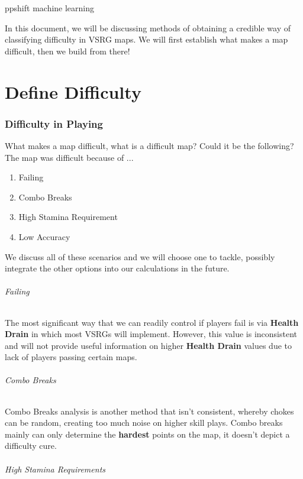 \documentclass{article}
\begin{document}
	ppshift machine learning
	
	In this document, we will be discussing methods of obtaining a credible way of classifying difficulty in VSRG maps. We will first establish what makes a map difficult, then we build from there!
	
\part{Define Difficulty}
\section{Difficulty in Playing}

	What makes a map difficult, what is a difficult map? Could it be the following?
	The map was difficult because of ...
\begin{enumerate}
	\item Failing
	\item Combo Breaks
	\item High Stamina Requirement
	\item Low Accuracy
\end{enumerate}
We discuss all of these scenarios and we will choose one to tackle, possibly integrate the other options into our calculations in the future.

\paragraph{Failing}

The most significant way that we can readily control if players fail is via \textbf{Health Drain} in which most VSRGs will implement. However, this value is inconsistent and will not provide useful information on higher \textbf{Health Drain} values due to lack of players passing certain maps.

\paragraph{Combo Breaks}

Combo Breaks analysis is another method that isn't consistent, whereby chokes can be random, creating too much noise on higher skill plays. Combo breaks mainly can only determine the \textbf{hardest} points on the map, it doesn't depict a difficulty cure.

\paragraph{High Stamina Requirements}
\end{document}
